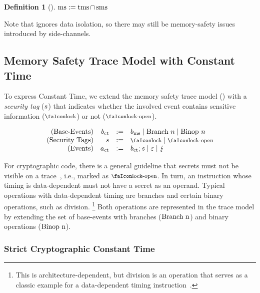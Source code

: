 \documentclass[dvipsnames,conference]{IEEEtran}
\theoremstyle{definition}
\newtheorem{definition}{Definition}[section]
\begin{document}
\begin{definition}[]\label{def:trace:msdef}
  $
  \operatorname{ms}:=\operatorname{tms} \cap \operatorname{sms}
  $
\end{definition}

Note that  ignores data isolation, so there may still be memory-safety issues introduced by side-channels.

\subsection{Memory Safety Trace Model with Constant Time}\label{subsec:scct:tracemodel}

To express Constant Time, we extend the memory safety trace model () with a {\em security tag} ($s$) that indicates whether the involved event contains sensitive information ($\lock$) or not ($\unlock$).

\vspace{-.5em}
\[
  \begin{array}{rrcl}
    (\text{Base-Events}) & \preevent[_{\ctsafe}] &:=& \preevent[_{\mssafe}] \mid \ev{Branch\ }n \mid \ev{Binop\ }n\\
    (\text{Security Tags}) & \securitytag &:=& \lock \mid \unlock\\ 
    (\text{Events}) & \event[_{\ctsafe}] &:=& \preevent[_{\ctsafe}];\securitytag \mid \emptyevent \mid \lightning \\ 
  \end{array}
\]

For cryptographic code, there is a general guideline that secrets must not be visible on a trace~\cite{ctguidelines}, i.e., marked as $\unlock$.
In turn, an instruction whose timing is data-dependent must not have a secret as an operand.
Typical operations with data-dependent timing are branches and certain binary operations, such as division.%
\footnote{
	This is architecture-dependent, but division is an operation that serves as a classic example for a data-dependent timing instruction~\cite[p.~755]{arm-refman}.
}
Both operations are represented in the trace model by extending the set of base-events with branches ($\text{Branch\ n}$) and binary operations ($\text{Binop\ n}$).

\subsubsection{Strict Cryptographic Constant Time}
\end{document}
